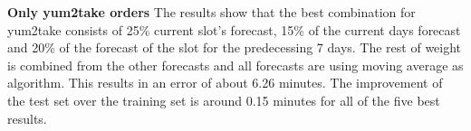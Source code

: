 \begin{table}[h]
\centering
\caption{Combination of Categorizations results for all orders}
\label{Combination of Categorizations results for all orders}
\end{table}
\newline\newline\textbf{Only yum2take orders}\newline
The results show that the best combination for yum2take consists of 25\% current slot’s forecast, 15\% of the current day\’s forecast and 20\% of the forecast of the slot for the predecessing 7 days. The rest of weight is combined from the other forecasts and all forecasts are using moving average as algorithm. This results in an error of about 6.26 minutes. The improvement of the test set over the training set is around 0.15 minutes for all of the five best results.
